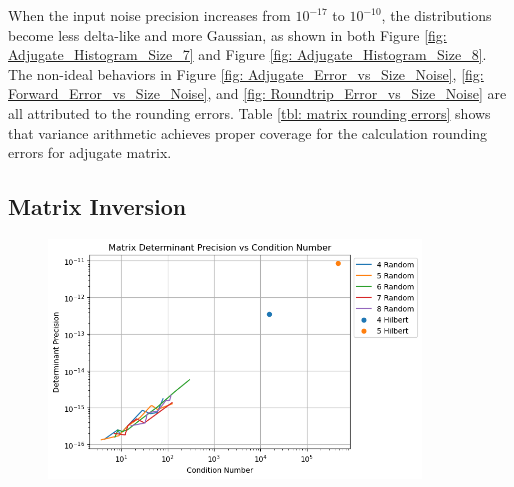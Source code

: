 \documentclass[twoside]{article}
\numberwithin{equation}{section}
\begin{document}
When the input noise precision increases from $10^{-17}$ to  $10^{-10}$, the distributions become less delta-like and more Gaussian, as shown in both Figure \ref{fig: Adjugate_Histogram_Size_7} and Figure \ref{fig: Adjugate_Histogram_Size_8}. 
The non-ideal behaviors in Figure \ref{fig: Adjugate_Error_vs_Size_Noise}, \ref{fig: Forward_Error_vs_Size_Noise}, and \ref{fig: Roundtrip_Error_vs_Size_Noise} are all attributed to the rounding errors.
Table \ref{tbl: matrix rounding errors} shows that variance arithmetic achieves proper coverage for the calculation rounding errors for adjugate matrix.



\subsection{Matrix Inversion}

\begin{figure}[p]
\centering
\includegraphics[height=2.5in]{Matrix_Determinant_Prec_vs_Condition.png} 
\label{fig: Matrix_Determinant_Prec_vs_Condition}
\end{figure}

\iffalse
\end{document}
